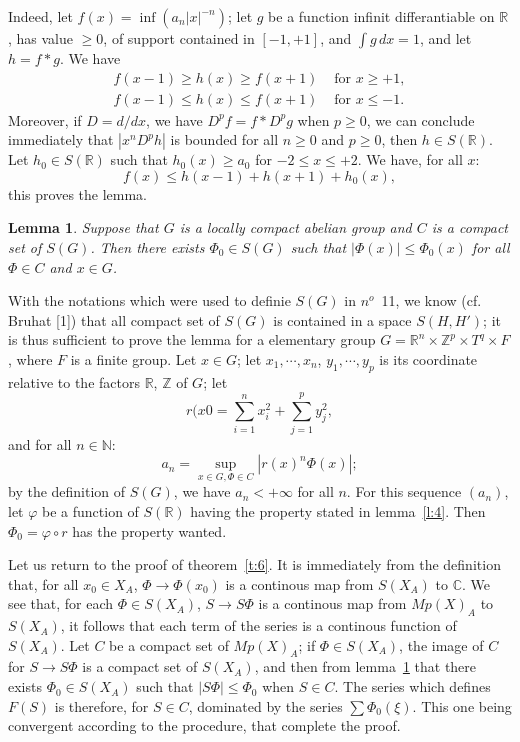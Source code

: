 \documentclass[12pt]{amsart}
\newtheorem{lemma}{Lemma}
\def\bR{{\mathbb{R}}}
\def\bN{{\mathbb{N}}}
\def\bZ{{\mathbb{Z}}}
\def\bC{{\mathbb{C}}}
\def\abs#1{\left|{#1}\right|}
\begin{document}
Indeed, let $f(x) = \inf(a_n|x|^{-n})$; let $g$ be a function infinit 
differantiable on $\bR$, has value $\geq 0$, of support contained in $[-1,+1]$,
and $\int g\, dx = 1$, and let $h = f*g$. 
We have
\begin{align*}
f(x-1) \geq h(x)\geq f(x+1)  &\text{ for } x\geq +1,\\
f(x-1) \leq h(x) \leq f(x+1) &\text{ for } x\leq -1.
\end{align*}
Moreover, if $D=d/dx$, we have $D^pf = f*D^pg$ when $p\geq 0$, 
we can conclude immediately that $|x^nD^ph|$ is bounded for all $n\geq 0$
and $p\geq 0$, then $h\in S(\bR)$.
Let $h_0\in S(\bR)$ such that $h_0(x)\geq a_0$ for $-2\leq x\leq +2$. 
We have, for all $x$:
\[
f(x)\leq h(x-1)+h(x+1)+h_0(x),
\] 
this proves the lemma.

\begin{lemma}\label{l:5}
Suppose that $G$ is a locally compact abelian group and 
$C$ is a compact set of $S(G)$. Then there exists $\Phi_0\in S(G)$
such that $|\Phi(x)|\leq \Phi_0(x)$ for all $\Phi\in C$ and $x\in G$. 
\end{lemma}

With the notations which were used to definie $S(G)$ in $n^o$~11,
we know (cf. Bruhat [1]) that all compact set of $S(G)$ is contained in 
a space $S(H, H')$; it is thus sufficient to prove the lemma for a elementary
group $G=\bR^n\times \bZ^p\times T^q\times F$, where $F$ is a finite group. 
Let $x\in G$; let $x_1, \cdots, x_n$, $y_1, \cdots, y_p$ is its coordinate 
relative to the factors $\bR$, $\bZ$ of $G$; let 
\[
r(x0 = \sum_{i=1}^n x_i^2 + \sum_{j=1}^p y_j^2,
\]
and for all $n\in \bN$:
\[
a_n = \sup_{x\in G, \Phi\in C} \abs{r(x)^n\Phi(x)};
\]
by the definition of $S(G)$, we have $a_n < +\infty$ for all $n$. 
For this sequence $(a_n)$, let $\varphi$ be a function of $S(\bR)$
having the property stated in lemma~\ref{l:4}. Then $\Phi_0 = \varphi\circ r$
has the property wanted.

Let us return to the proof of theorem~\ref{t:6}. It is immediately from the 
definition that, for all $x_0\in X_A$, $\Phi\to \Phi(x_0)$ 
is a continous map from $S(X_A)$ to $\bC$. 
We see that, for each $\Phi\in S(X_A)$, $S\to S\Phi$ is a continous map
from $Mp(X)_A$ to $S(X_A)$, it follows that each term of the series 
is a continous function of $S(X_A)$. Let $C$ be a compact set of $Mp(X)_A$;
if $\Phi\in S(X_A)$, the image of $C$ for $S\to S\Phi$ is a compact 
set of $S(X_A)$, and then from lemma~\ref{l:5} that there exists 
$\Phi_0\in S(X_A)$ such that $\abs{S\Phi} \leq \Phi_0$ when $S \in C$. 
The series which defines $F(S)$ is 
therefore, for $S\in C$,  dominated by the series $\sum\Phi_0(\xi)$. 
This one being convergent 
according to the procedure, that complete the proof. 
\end{document}
